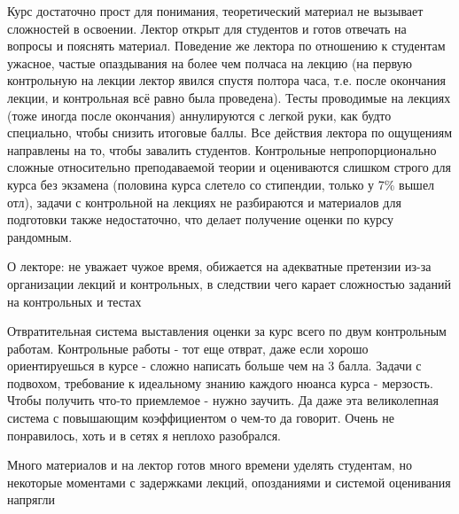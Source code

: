             \begin{commentbox} 
                Курс достаточно прост для понимания, теоретический материал не вызывает сложностей в освоении. Лектор открыт для студентов и готов отвечать на вопросы и пояснять материал. Поведение же лектора по отношению к студентам ужасное, частые опаздывания на более чем полчаса на лекцию (на первую контрольную на лекции лектор явился спустя полтора часа, т.е. после окончания лекции, и контрольная всё равно была проведена). Тесты проводимые на лекциях (тоже иногда после окончания) аннулируются с легкой руки, как будто специально, чтобы снизить итоговые баллы. Все действия лектора по ощущениям направлены на то, чтобы завалить студентов. Контрольные непропорционально сложные относительно преподаваемой теории и оцениваются слишком строго для курса без экзамена (половина курса слетело со стипендии, только у 7\% вышел отл), задачи с контрольной на лекциях не разбираются и материалов для подготовки также недостаточно, что делает получение оценки по курсу рандомным. 
            \end{commentbox} 
        
            \begin{commentbox} 
                О лекторе: не уважает чужое время, обижается на адекватные претензии из-за организации лекций и контрольных, в следствии чего карает сложностью заданий на контрольных и тестах 
            \end{commentbox} 
        
            \begin{commentbox} 
                Отвратительная система выставления оценки за курс всего по двум контрольным работам. Контрольные работы - тот еще отврат, даже если хорошо ориентируешься в курсе - сложно написать больше чем на 3 балла. Задачи с подвохом, требование к идеальному знанию каждого нюанса курса - мерзость. Чтобы получить что-то приемлемое - нужно заучить. Да даже эта великолепная система с повышающим коэффициентом о чем-то да говорит. Очень не понравилось, хоть и в сетях я неплохо разобрался. 
            \end{commentbox} 
        
            \begin{commentbox} 
                Много материалов и на лектор готов много времени уделять студентам, но некоторые моментами с задержками лекций, опозданиями и системой оценивания напрягли 
            \end{commentbox} 
        
